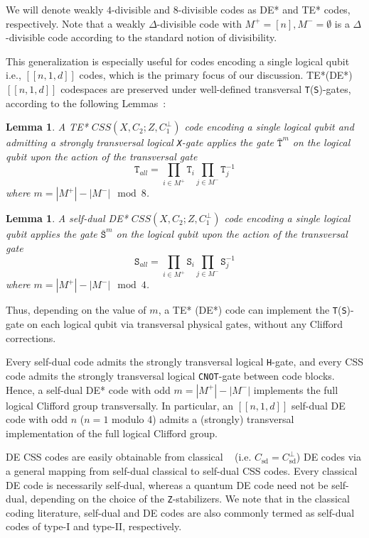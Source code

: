 \documentclass[journal]{IEEEtran}
\newcommand{\T}{\texttt{T}}
\newcommand{\Sgate}{\texttt{S}}
\newcommand{\X}{\texttt{X}}
\newcommand{\Z}{\texttt{Z}}
\newcommand{\Hgate}{\texttt{H}}
\newcommand{\CNOT}{\texttt{CNOT}}
\newtheorem{lemma}[theorem]{Lemma}
\begin{document}
We will denote weakly $4$-divisible and $8$-divisible codes as DE* and TE* codes, respectively.  Note that a weakly $\Delta$-divisible code with $M^+=[n], M^- = \emptyset$ is a $\Delta$-divisible code according to the standard notion of divisibility.

This generalization is especially useful for codes encoding a single logical qubit i.e., $[[n,1,d]]$ codes, which is the primary focus of our discussion. TE*(DE*) $[[n,1,d]]$ codespaces are preserved under well-defined transversal \T(\Sgate)-gates, according to the following Lemmas~\cite{bravyi_doubled_2015}:
\begin{lemma}\label{lemma:TE*gate}
    A TE* $CSS(X,C_2;Z,C_1^\perp)$ code encoding a single logical qubit and admitting a strongly transversal logical \X-gate applies the gate $\bar{\T}^m$ on the logical qubit upon the action of the transversal gate 
    \begin{equation}
        \T_{all}= \displaystyle {\prod_{i\in M^+}}\T_i \displaystyle{\prod_{j\in M^-}}\T_j^{-1} 
    \end{equation}
    where $m=|M^+|-|M^-| \mod{8}$.
\end{lemma}
\begin{lemma}
    A self-dual DE* $CSS(X,C_2;Z,C_1^\perp)$ code encoding a single logical qubit applies the gate $\bar{\Sgate}^m$ on the logical qubit upon the action of the transversal gate 
    \begin{equation}
        \Sgate_{all}= \displaystyle {\prod_{i\in M^+}}\Sgate_i \displaystyle{\prod_{j\in M^-}}\Sgate_j^{-1} 
    \end{equation}
    where $m=|M^+|-|M^-| \mod{4}$.
\end{lemma}
Thus, depending on the value of $m$, a TE* (DE*) code can implement the \T(\Sgate)-gate on each logical qubit via transversal physical gates, without any Clifford corrections. 

Every self-dual code admits the strongly transversal logical \Hgate-gate, and every CSS code admits the strongly transversal logical \CNOT-gate between code blocks. Hence, a self-dual DE* code with odd $m=|M^+|-|M^-|$ implements the full logical Clifford group transversally. 
In particular, an $[[n,1,d]]$ self-dual DE code with odd $n$ ($n = 1$ modulo 4) admits a (strongly) transversal implementation of the full logical Clifford group.

DE CSS codes are easily obtainable from classical ~\cite{macwilliams_theory_1977,rains_self-dual_2002,kurz_divisible_2023} (i.e. $C_{\textrm{sd}}=C_{\textrm{sd}}^\perp$) DE codes via a general mapping from self-dual classical to self-dual CSS codes. Every classical DE code is necessarily self-dual, whereas a quantum DE code need not be self-dual, depending on the choice of the \Z-stabilizers. We note that in the classical coding literature, self-dual and DE codes are also commonly termed as self-dual codes of type-I and type-II, respectively.
\end{document}
